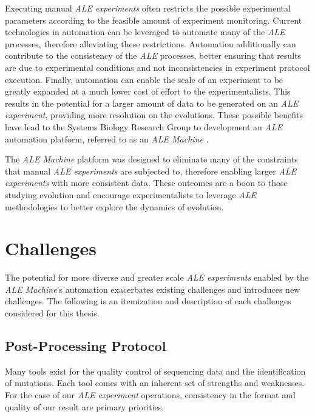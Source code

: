 \documentclass[12pt,final,masters,chapterheads]{ucsd}  %
\begin{document}
Executing manual \textit{ALE experiments} often restricts the possible experimental parameters according to the feasible amount of experiment monitoring. Current technologies in automation can be leveraged to automate many of the \textit{ALE} processes, therefore alleviating these restrictions. Automation additionally can contribute to the consistency of the \textit{ALE} processes, better ensuring that results are due to experimental conditions and not inconsistencies in experiment protocol execution. Finally, automation can enable the scale of an experiment to be greatly expanded at a much lower cost of effort to the experimentalists. This results in the potential for a larger amount of data to be generated on an \textit{ALE experiment}, providing more resolution on the evolutions. These possible benefits have lead to the Systems Biology Research Group to development an \textit{ALE} automation platform, referred to as an \textit{ALE Machine} \cite{ryan_thesis}.

The \textit{ALE Machine} platform was designed to eliminate many of the constraints that manual \textit{ALE experiments} are subjected to, therefore enabling larger \textit{ALE experiments} with more consistent data. These outcomes are a boon to those studying evolution and encourage experimentalists to leverage \textit{ALE} methodologies to better explore the dynamics of evolution.

\section{Challenges}

% 
% 

The potential for more diverse and greater scale \textit{ALE experiments} enabled by the \textit{ALE Machine}'s automation exacerbates existing challenges and introduces new challenges. The following is an itemization and description of each challenges considered for this thesis.

\subsection{Post-Processing Protocol}

Many tools exist for the quality control of sequencing data and the identification of mutations. Each tool comes with an inherent set of strengths and weaknesses. For the case of our \textit{ALE experiment} operations, consistency in the format and quality of our result are primary priorities. %
\end{document}
